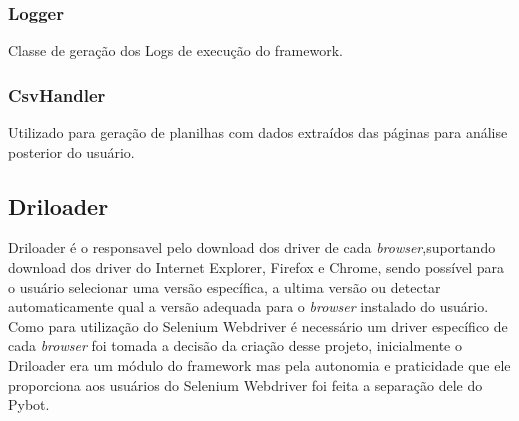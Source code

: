             \subsubsection{Logger}
            Classe de geração dos Logs de execução do framework.

            \subsubsection{CsvHandler}
            Utilizado para geração de planilhas com dados extraídos das páginas para análise posterior do usuário.

        \subsection{Driloader}
        \label{driloader}
            Driloader é o responsavel pelo download dos driver de cada \emph{browser},suportando download dos driver do Internet Explorer,
            Firefox e Chrome, sendo possível para o usuário selecionar uma versão específica, a ultima versão ou detectar
            automaticamente qual a versão adequada para o \emph{browser} instalado do usuário. Como para utilização do Selenium
            Webdriver é necessário um driver específico de cada \emph{browser} foi tomada a decisão da criação desse projeto,
            inicialmente o Driloader era um módulo do framework mas pela autonomia e praticidade que ele proporciona aos
            usuários do Selenium Webdriver foi feita a separação dele do Pybot.




